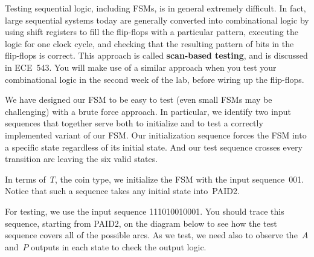 Testing sequential logic, including FSMs, is in general extremely difficult.
In fact, large sequential systems today are generally converted into 
combinational logic by using shift registers to fill the 
flip-flops with a particular pattern, 
executing the logic for one clock cycle, and checking that the resulting 
pattern of bits in the flip-flops is correct.  This approach is called 
{\bf scan-based testing}, and is discussed in ECE~543.  You 
will make use of a similar approach
when you test your combinational logic in the second week of the lab,
before wiring up the flip-flops.

We have designed our FSM to be easy to test (even small FSMs
may be challenging) with a brute force approach.  In particular, we 
identify two input sequences that together serve both to initialize and 
to test a correctly implemented variant of our FSM.  Our initialization
sequence forces the FSM into a specific state regardless of its initial
state.  And our test sequence crosses every transition arc leaving the
six valid states.

\pagebreak

In terms of~$T$, the coin type, we initialize the FSM with the
input sequence~001.  Notice that such a sequence takes any initial 
state into~PAID2.

For testing, we use the input sequence 111010010001.  You should trace 
this sequence, starting from PAID2, on the diagram below to see how the
test sequence covers all of the possible arcs.  As we test, we need also
to observe the~$A$ and~$P$ outputs in each state to check the output
logic.\\

\centerline{}

\pagebreak


